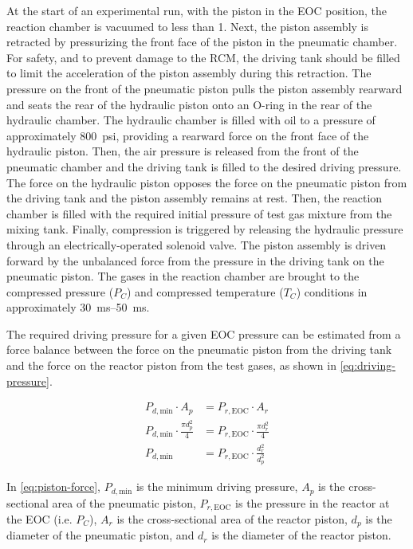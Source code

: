 \documentclass[12pt, letterpaper]{article}
\begin{document}
At the start of an experimental run, with the piston in the
EOC position, the reaction chamber is vacuumed to less
than \SI{1}{\torr}. Next, the piston assembly is retracted by pressurizing
the front face of the piston in the pneumatic chamber.
For safety, and to prevent damage to the RCM, the driving tank should
be filled to limit the acceleration of the piston assembly during this
retraction.
The pressure on the front of the pneumatic piston pulls the
piston assembly rearward and seats the rear of the
hydraulic piston onto an O-ring in the rear of the
hydraulic chamber. The hydraulic chamber is filled with oil to
a pressure of approximately \SI{800}{psi}, providing a rearward force on the
front face of the hydraulic piston. Then, the air pressure is released from
the front of the pneumatic chamber and the driving tank is filled to
the desired driving pressure. The
force on the hydraulic piston opposes the force on the pneumatic piston
from the driving tank and the piston assembly remains at rest. Then, the
reaction chamber is filled with the required initial pressure of test
gas mixture from the mixing tank. Finally, compression is triggered by
releasing the hydraulic pressure through an electrically-operated solenoid
valve. The piston assembly is driven forward by the unbalanced force from
the pressure in the driving tank on the pneumatic piston. The gases
in the reaction chamber are brought to the compressed pressure ($P_C$) and
compressed temperature ($T_C$) conditions in approximately
\SIrange{30}{50}{\milli\second}.

The required driving pressure for a given EOC pressure can be estimated
from a force balance between the force on the pneumatic piston from the
driving tank and the force on the reactor piston from the test gases,
as shown in \autoref{eq:driving-pressure}.

\begin{subequations}
\label{eq:piston-force}
\begin{align}
    P_{d,\text{min}} \cdot A_p &= P_{r,\text{EOC}} \cdot A_r \\
    P_{d,\text{min}} \cdot \frac{\pi d_p^2}{4} &= P_{r,\text{EOC}} \cdot \frac{\pi d_r^2}{4} \\
    P_{d,\text{min}} &= P_{r,\text{EOC}} \cdot \frac{d_r^2}{d_p^2} \label{eq:driving-pressure}
\end{align}
\end{subequations}

In \autoref{eq:piston-force}, $P_{d,\text{min}}$ is the minimum
driving pressure, $A_p$ is the cross-sectional area of the pneumatic piston,
$P_{r,\text{EOC}}$ is the pressure in the reactor at the EOC (i.e. $P_C$),
$A_r$ is the cross-sectional area of the reactor piston, $d_p$ is the diameter
of the pneumatic piston, and $d_r$ is the diameter of the reactor piston.
\end{document}
